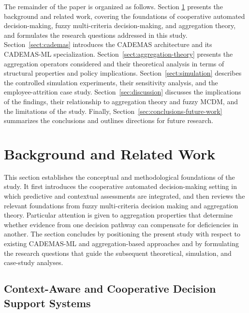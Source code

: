 \documentclass[mathematics,article,submit,moreauthors]{Definitions/mdpi}
\begin{document}
The remainder of the paper is organized as follows. Section
\ref{sec:background-related-work} presents the background and related work,
covering the foundations of cooperative automated decision-making, fuzzy
multi-criteria decision-making, and aggregation theory, and formulates the
research questions addressed in this study. Section~\ref{sect:cademas}
introduces the CADEMAS architecture and its CADEMAS-ML specialization.
Section~\ref{sect:aggregation-theory} presents the aggregation operators
considered and their theoretical analysis in terms of structural properties
and policy implications. Section~\ref{sect:simulation} describes the
controlled simulation experiments, their sensitivity analysis, and the
employee-attrition case study. Section~\ref{sec:discussion}
discusses the implications of the findings, their relationship to aggregation
theory and fuzzy MCDM, and the limitations of the study. Finally,
Section~\ref{sec:conclusions-future-work} summarizes the conclusions and
outlines directions for future research.


\section{Background and Related Work}
\label{sec:background-related-work}

This section establishes the conceptual and methodological foundations of the
study. It first introduces the cooperative automated decision-making setting
in which predictive and contextual assessments are integrated, and then
reviews the relevant foundations from fuzzy multi-criteria decision making
and aggregation theory. Particular attention is given to aggregation
properties that determine whether evidence from one decision pathway can
compensate for deficiencies in another. The section concludes by positioning
the present study with respect to existing CADEMAS-ML and aggregation-based
approaches and by formulating the research questions that guide the subsequent
theoretical, simulation, and case-study analyses.


\subsection{Context-Aware and Cooperative Decision Support Systems}
\label{subsec:context-aware-dss}
\end{document}
